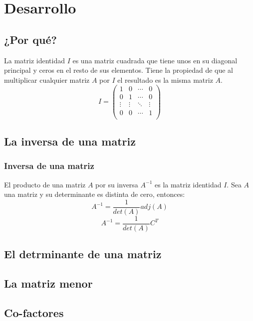 \documentclass{beamer}
\begin{document}
    \section{Desarrollo}
    \subsection{¿Por qué?}

    \begin{frame}
        La matriz identidad $I$ es una matriz cuadrada que tiene unos en su diagonal principal y ceros en el resto de sus elementos.
        Tiene la propiedad de que al multiplicar cualquier matriz $A$ por $I$ el resultado es la misma matriz $A$.
        $$
        I =
        \begin{pmatrix}
            1 & 0 & \cdots & 0 \\
            0 & 1 & \cdots & 0 \\
            \vdots & \vdots & \ddots & \vdots \\
            0 & 0 & \cdots & 1 \\
        \end{pmatrix}
        $$

    \end{frame}


    \subsection{La inversa de una matriz}

    \begin{frame}
        \frametitle{Inversa de una matriz}
        El producto de una matriz $A$ por su inversa $A^{-1}$ es la matriz identidad $I$.
        Sea $A$ una matriz y su determinante es distinta de cero, entonces:
        $$
        A^{-1} = \frac{1}{det(A)}adj(A)
        $$
        $$
        A^{-1} = \frac{1}{det(A)}C^{T}
        $$
    \end{frame}

    \subsection{El detrminante de una matriz}
    \subsection{La matriz menor}
    \subsection{Co-factores}
\end{document}
